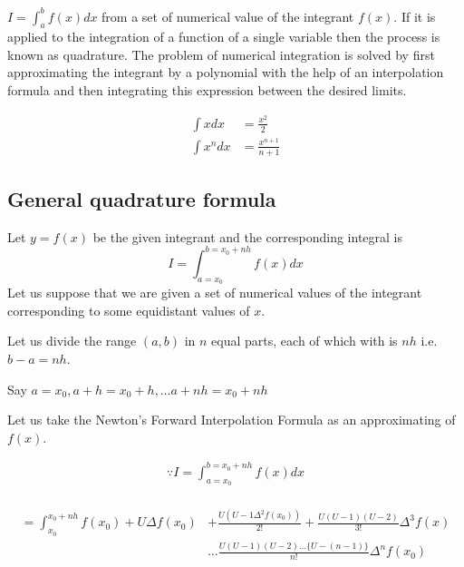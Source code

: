 \documentclass[11pt, a4paper, oneside]{book}
\begin{document}
          $I=\int_{a}^{b}f(x)dx$ from a set of numerical value of the integrant $f(x)$.
          If it is applied to the integration of a function of a single variable then the
          process is known as quadrature. The problem of numerical integration is solved by
          first approximating the integrant by a polynomial with the help of an interpolation
          formula and then integrating this expression between the desired limits.

          \begin{align*}
            \int xdx&=\frac{x^2}{2}\\
            \int x^ndx&=\frac{x^{n+1}}{n+1}
          \end{align*}

        \subsection{General quadrature formula}%
        Let $y=f(x)$ be the given integrant and the corresponding integral is
        \begin{equation*}
          I=\int_{a=x_0}^{b=x_0+nh}f(x)dx
        \end{equation*}
        Let us suppose that we are given a set of numerical values of the integrant corresponding
        to some equidistant values of $x$.

        Let us divide the range $(a,b)$ in $n$ equal parts, each of which with is $nh$ i.e. $b-a=nh$.

        \noindent Say $a=x_0, a+h=x_0+h,\dots a+nh=x_0+nh$

        Let us take the Newton's Forward Interpolation Formula as an approximating of $f(x)$.

        \begin{align*}
          \because I=\int_{a=x_0}^{b=x_0+nh}f(x)dx\\
        \end{align*}

        \begin{align*}
          =\int_{x_0}^{x_0+nh}f(x_0)+U\Delta f(x_0) &+ \frac{U(U-1\Delta^2f(x_0))}{2!}+\frac{U(U-1)(U-2)}{3!}\Delta^3f(x)\\
                                                    &  \dots\frac{U(U-1)(U-2)\dots\{U-(n-1)\}}{n!}\Delta^nf(x_0)
        \end{align*}
\end{document}
